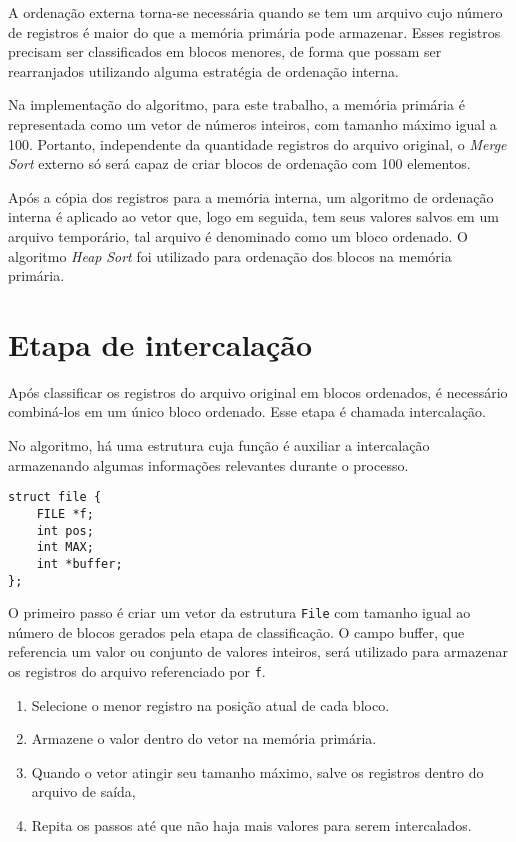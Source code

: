 \documentclass[a4paper, 12pt]{report}
\begin{document}
A ordenação externa torna-se necessária quando se tem um arquivo cujo número
de registros é maior do que a memória primária pode armazenar. Esses registros
precisam ser classificados em blocos menores, de forma que possam ser
rearranjados utilizando alguma estratégia de ordenação interna.

Na implementação do algoritmo, para este trabalho, a memória primária é
representada como um vetor de números inteiros, com tamanho máximo igual a 100.
Portanto, independente da quantidade registros do arquivo original, o \emph{Merge}
\emph{Sort} externo só será capaz de criar blocos de ordenação com 100 elementos.

Após a cópia dos registros para a memória interna, um algoritmo de ordenação
interna é aplicado ao vetor que, logo em seguida, tem seus valores salvos
em um arquivo temporário, tal arquivo é denominado como um bloco ordenado. O
algoritmo \emph{Heap} \emph{Sort} foi utilizado para ordenação dos blocos na memória
primária.

\section{Etapa de intercalação}
\label{sec-2-1-2}

Após classificar os registros do arquivo original em blocos ordenados, é
necessário combiná-los em um único bloco ordenado. Esse etapa é chamada
intercalação.

No algoritmo, há uma estrutura cuja função é auxiliar a intercalação
armazenando algumas informações relevantes durante o processo.

\begin{verbatim}
struct file {
    FILE *f;
    int pos;
    int MAX;
    int *buffer;
};
\end{verbatim}

O primeiro passo é criar um vetor da estrutura \texttt{File} com tamanho igual ao
número de blocos gerados pela etapa de classificação. O campo buffer,
que referencia um valor ou conjunto de valores inteiros, será utilizado para
armazenar os registros do arquivo referenciado por \texttt{f}.

\begin{enumerate}
\item Selecione o menor registro na posição atual de cada bloco.
\item Armazene o valor dentro do vetor na memória primária.
\item Quando o vetor atingir seu tamanho máximo, salve os registros dentro do
arquivo de saída,
\item Repita os passos até que não haja mais valores para serem intercalados.
\end{enumerate}
\end{document}
